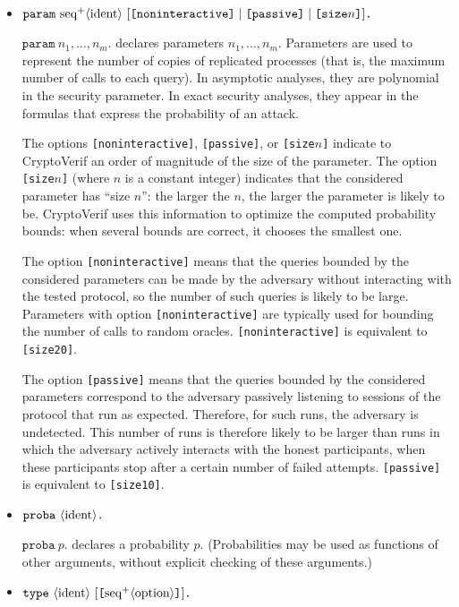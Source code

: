 \begin{itemize}
\item $\texttt{param}\ \neseq{ident}\ [\texttt{[noninteractive]}\mid \texttt{[passive]} \mid \texttt{[size$n$]}]\texttt{.}$

$\texttt{param}\ n_1, \ldots, n_m\texttt{.}$ declares parameters $n_1, \ldots, n_m$.
Parameters are used to represent the number of copies of replicated processes
(that is, the maximum number of calls to each query).
In asymptotic analyses, they are polynomial in the security parameter.
In exact security analyses, they appear in the formulas that express the
probability of an attack.

The options \texttt{[noninteractive]}, \texttt{[passive]}, or \texttt{[size$n$]}
indicate to CryptoVerif an order of magnitude of the size of the parameter.
%
The option \texttt{[size$n$]} (where $n$ is a constant integer) indicates
that the considered parameter has ``size $n$'': the larger the $n$, the
larger the parameter is likely to be.
CryptoVerif uses this
information to optimize the computed probability bounds: when several
bounds are correct, it chooses the smallest one.

The option \texttt{[noninteractive]} means that
the queries bounded by the considered parameters can be made by the
adversary without interacting with the tested protocol, so the number
of such queries is likely to be large.
Parameters with option \texttt{[noninteractive]} are typically 
used for bounding the number of calls to random oracles.
\texttt{[noninteractive]} is equivalent to \texttt{[size20]}.

The option \texttt{[passive]} means that the queries bounded by the
considered parameters correspond to the adversary passively listening
to sessions of the protocol that run as expected. Therefore, for such
runs, the adversary is undetected. This number of runs is therefore
likely to be larger than runs in which the adversary actively 
interacts with the honest participants, when these participants stop 
after a certain number of failed attempts.
\texttt{[passive]} is equivalent to \texttt{[size10]}.

\item $\texttt{proba}\ \nonterm{ident}\texttt{.}$

$\texttt{proba}\ p\texttt{.}$ declares a probability $p$.
(Probabilities may be used as functions of other arguments,
without explicit checking of these arguments.)

\item $\texttt{type}\ \nonterm{ident}\ [\texttt{[}\neseq{option}\texttt{]}]\texttt{.}$


\end{itemize}
